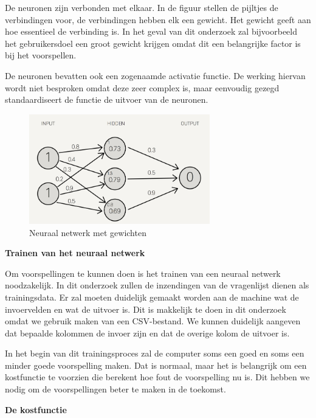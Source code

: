 \vspace{1em}
De neuronen zijn verbonden met elkaar. In de figuur stellen de pijltjes de verbindingen voor, de verbindingen hebben elk een gewicht. Het gewicht geeft aan hoe essentieel de verbinding is. In het geval van dit onderzoek zal bijvoorbeeld het gebruikersdoel een groot gewicht krijgen omdat dit een belangrijke factor is bij het voorspellen. 

De neuronen bevatten ook een zogenaamde activatie functie. De werking hiervan wordt niet besproken omdat deze zeer complex is, maar eenvoudig gezegd standaardiseert de functie de uitvoer van de neuronen. 

\vspace{2em}
\begin{figure}[h!]
\centering
\includegraphics[width=0.7\textwidth]{bachproef/img/gewichten_netwerk.png}
\caption{Neuraal netwerk met gewichten}
\end{figure}

\newpage

\textbf{Trainen van het neuraal netwerk}

Om voorspellingen te kunnen doen is het trainen van een neuraal netwerk noodzakelijk. In dit onderzoek zullen de inzendingen van de vragenlijst dienen als trainingsdata. Er zal moeten duidelijk gemaakt worden aan de machine wat de invoervelden en wat de uitvoer is. Dit is makkelijk te doen in dit onderzoek omdat we gebruik maken van een CSV-bestand. We kunnen duidelijk aangeven dat bepaalde kolommen de invoer zijn en dat de overige kolom de uitvoer is.

In het begin van dit trainingsproces zal de computer soms een goed en soms een minder goede voorspelling maken. Dat is normaal, maar het is belangrijk om een kostfunctie te voorzien die berekent hoe fout de voorspelling nu is. Dit hebben we nodig om de voorspellingen beter te maken in de toekomst.

\textbf{De kostfunctie}


